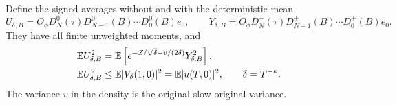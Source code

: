 \begin{proposition}
  \label{P:raw-block-point-comparison}
  Define the signed averages without and with the deterministic mean
  \[
    U_{\delta,B}
    =O_\phi D_N^0(\tau)D_{N-1}^0(B)\cdots D_0^0(B)e_0,
    \qquad
    Y_{\delta,B}
    =O_\phi D_N^+(\tau)D_{N-1}^+(B)\cdots D_0^+(B)e_0.
  \]
  They have all finite unweighted moments, and
  \begin{align}
    \mathbb{E} U_{\delta,B}^2
    &=\mathbb{E}\left[e^{-Z/\sqrt\delta-v/(2\delta)}
    Y_{\delta,B}^2\right],
    \label{E:raw-block-square-identity}\\
    \mathbb{E} U_{\delta,B}^2
    &\le\mathbb{E}|V_\delta(1,0)|^2
    =\mathbb{E}|u(T,0)|^2,\qquad \delta=T^{-\kappa}.
    \label{E:raw-block-original-comparison}
  \end{align}
  The variance $v$ in the density is the original slow original variance.
\end{proposition}


